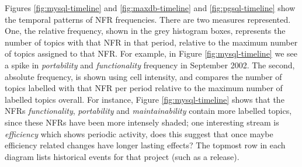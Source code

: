\documentclass[smallextended]{svjour3}       %
\begin{document}
Figures \ref{fig:mysql-timeline} and \ref{fig:maxdb-timeline} and \ref{fig:pgsql-timeline} show the
temporal patterns of NFR frequencies.
There are two measures represented. 
One, the relative frequency, shown in the grey histogram boxes, represents the number of topics with that NFR in that period, 
relative to the maximum number of topics assigned to that NFR. 
For example, in Figure \ref{fig:mysql-timeline} we see a spike in \emph{portability} and \emph{functionality} frequency in September 2002.
The second, absolute frequency, is shown using cell intensity, and compares the number of topics labelled with that NFR per period 
relative to the maximum number of labelled topics overall. 
For instance, Figure \ref{fig:mysql-timeline} shows that the NFRs
\emph{functionality}, \emph{portability} and \emph{maintainability}
contain more labelled topics, since these NFRs have been more
intensely shaded; 
one interesting stream is \emph{efficiency} which shows periodic
activity, does this suggest that once maybe efficiency related changes
have longer lasting effects?
The topmost row in each diagram lists historical events for that project (such as a release). 
\end{document}
